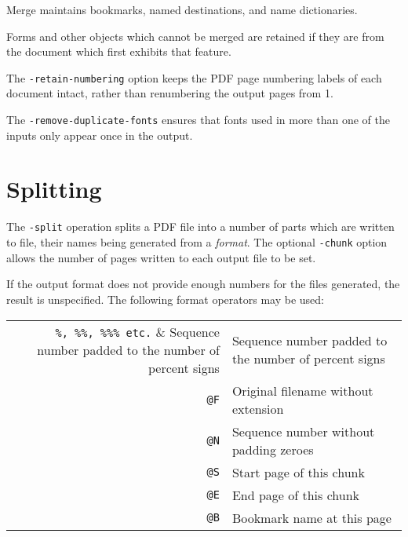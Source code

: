 \documentclass{book}
\begin{document}
\noindent Merge maintains bookmarks, named destinations, and name dictionaries.

Forms and other objects which cannot be merged are retained if they are from
the document which first exhibits that feature.

The \texttt{-retain-numbering} option keeps the PDF page numbering labels of
each document intact, rather than renumbering the output pages from 1.

The \texttt{-remove-duplicate-fonts} ensures that fonts used in more than one
of the inputs only appear once in the output.

  \section{Splitting}
   The \texttt{-split} operation splits a PDF file into a number of parts which
are written to file, their names being generated from a \emph{format}. The
optional \texttt{-chunk} option allows the number of pages written to each
output file to be set. 

\noindent{}


\noindent If the output format does not provide enough numbers for the files generated,
the result is unspecified. The following format operators may be used:

\begin{table}[h]
\centering
\begin{tabular}{rl}
  \verb!%, %%, %%% etc.! & Sequence number padded to the number of percent signs\\
  \texttt{@F} & Original filename without extension \\
  \texttt{@N} & Sequence number without padding zeroes \\
  \texttt{@S} & Start page of this chunk \\
  \texttt{@E} & End page of this chunk \\
  \texttt{@B} & Bookmark name at this page \\
\end{tabular}
\end{table}
\end{document}
